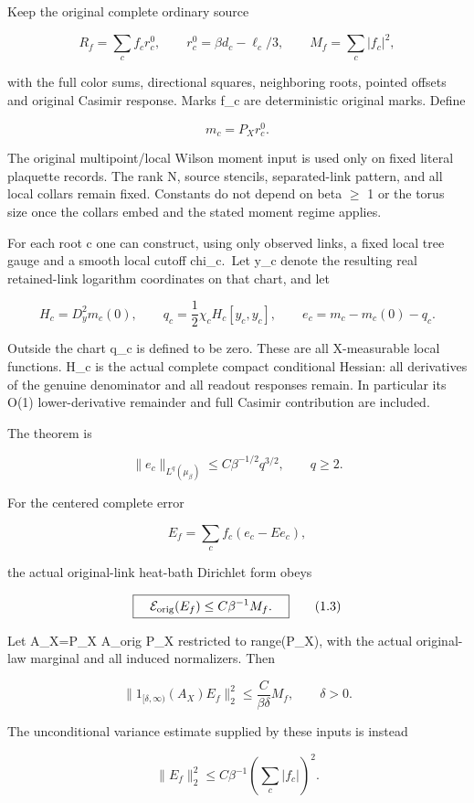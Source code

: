 \documentclass[
  11pt,
]{article}
\begin{document}
Keep the original complete ordinary source

\[
 R_f=\sum_cf_c r_c^0,\qquad
 r_c^0=\beta d_c-\ell_c/3,
 \qquad M_f=\sum_c|f_c|^2,
\]

with the full color sums, directional squares, neighboring roots,
pointed offsets and original Casimir response. Marks f\_c are
deterministic original marks. Define

\[
 m_c=P_Xr_c^0.
\]

The original multipoint/local Wilson moment input is used only on fixed
literal plaquette records. The rank N, source stencils, separated-link
pattern, and all local collars remain fixed. Constants do not depend on
beta \(\geq\) 1 or the torus size once the collars embed and the stated
moment regime applies.

For each root c one can construct, using only observed links, a fixed
local tree gauge and a smooth local cutoff chi\_c.~Let y\_c denote the
resulting real retained-link logarithm coordinates on that chart, and
let

\[
 H_c=D_y^2m_c(0),\qquad
 q_c=\frac12\chi_c H_c[y_c,y_c],\qquad
 e_c=m_c-m_c(0)-q_c.
\tag{1.1}
\]

Outside the chart q\_c is defined to be zero. These are all X-measurable
local functions. H\_c is the actual complete compact conditional
Hessian: all derivatives of the genuine denominator and all readout
responses remain. In particular its O(1) lower-derivative remainder and
full Casimir contribution are included.

The theorem is

\[
 \boxed{\quad
 \|e_c\|_{L^q(\mu_\beta)}
 \le C\beta^{-1/2}q^{3/2},\qquad q\ge2.
 \quad}
\tag{1.2}
\]

For the centered complete error

\[
 E_f=\sum_cf_c(e_c-Ee_c),
\]

the actual original-link heat-bath Dirichlet form obeys

\[
 \boxed{\quad
 \mathcal E_{\rm orig}(E_f)\le C\beta^{-1}M_f.
 \quad}
\tag{1.3}
\]

Let A\_X=P\_X A\_orig P\_X restricted to range(P\_X), with the actual
original-law marginal and all induced normalizers. Then

\[
 \boxed{\quad
 \|1_{[\delta,\infty)}(A_X)E_f\|_2^2
 \le\frac{C}{\beta\delta}M_f,\qquad\delta>0.
 \quad}
\tag{1.4}
\]

The unconditional variance estimate supplied by these inputs is instead

\[
 \boxed{\quad
 \|E_f\|_2^2\le C\beta^{-1}
             \left(\sum_c|f_c|\right)^2.
 \quad}
\tag{1.5}
\]
\end{document}
